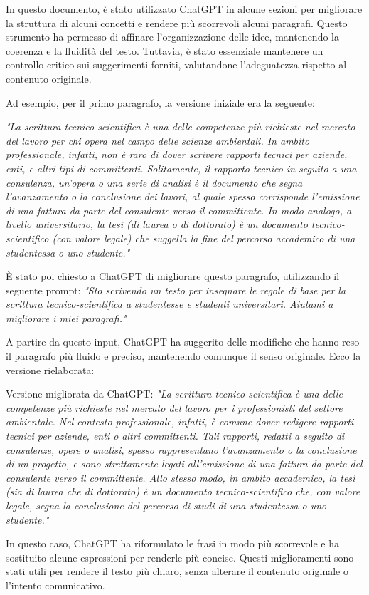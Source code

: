 \documentclass[9pt,a4paper,twoside]{rho-class/rho}
\begin{document}
In questo documento, è stato utilizzato ChatGPT in alcune sezioni per migliorare la struttura di alcuni concetti e rendere più scorrevoli alcuni paragrafi. Questo strumento ha permesso di affinare l’organizzazione delle idee, mantenendo la coerenza e la fluidità del testo. Tuttavia, è stato essenziale mantenere un controllo critico sui suggerimenti forniti, valutandone l’adeguatezza rispetto al contenuto originale.

\begin{info}    
Ad esempio, per il primo paragrafo, la versione iniziale era la seguente:

\textit{"La scrittura tecnico-scientifica è una delle competenze più richieste nel mercato del lavoro per chi opera nel campo delle scienze ambientali. In ambito professionale, infatti, non è raro di dover scrivere rapporti tecnici per aziende, enti, e altri tipi di committenti. Solitamente, il rapporto tecnico in seguito a una consulenza, un'opera o una serie di analisi è il documento che segna l'avanzamento o la conclusione dei lavori, al quale spesso corrisponde l'emissione di una fattura da parte del consulente verso il committente. In modo analogo, a livello universitario, la tesi (di laurea o di dottorato) è un documento tecnico-scientifico (con valore legale) che suggella la fine del percorso accademico di una studentessa o uno studente."}

È stato poi chiesto a ChatGPT di migliorare questo paragrafo, utilizzando il seguente prompt:
\textit{"Sto scrivendo un testo per insegnare le regole di base per la scrittura tecnico-scientifica a studentesse e studenti universitari. Aiutami a migliorare i miei paragrafi."}

A partire da questo input, ChatGPT ha suggerito delle modifiche che hanno reso il paragrafo più fluido e preciso, mantenendo comunque il senso originale. Ecco la versione rielaborata:

Versione migliorata da ChatGPT: \textit{"La scrittura tecnico-scientifica è una delle competenze più richieste nel mercato del lavoro per i professionisti del settore ambientale. Nel contesto professionale, infatti, è comune dover redigere rapporti tecnici per aziende, enti o altri committenti. Tali rapporti, redatti a seguito di consulenze, opere o analisi, spesso rappresentano l’avanzamento o la conclusione di un progetto, e sono strettamente legati all’emissione di una fattura da parte del consulente verso il committente. Allo stesso modo, in ambito accademico, la tesi (sia di laurea che di dottorato) è un documento tecnico-scientifico che, con valore legale, segna la conclusione del percorso di studi di una studentessa o uno studente."}

In questo caso, ChatGPT ha riformulato le frasi in modo più scorrevole e ha sostituito alcune espressioni per renderle più concise. Questi miglioramenti sono stati utili per rendere il testo più chiaro, senza alterare il contenuto originale o l'intento comunicativo.
\end{info}
\end{document}

